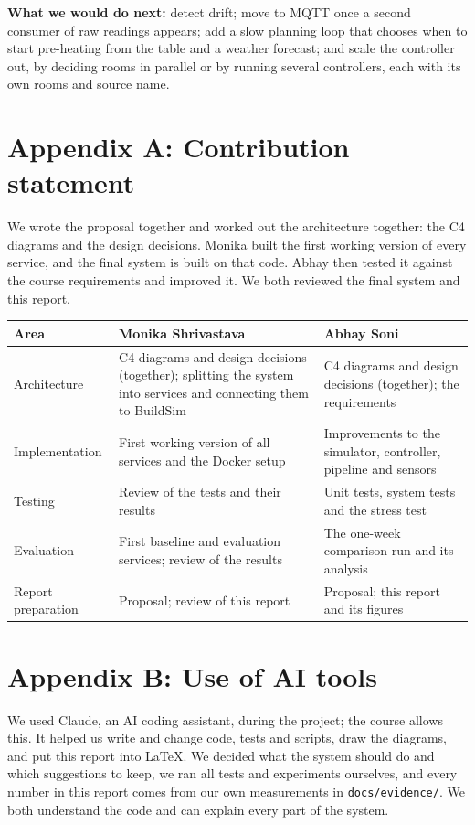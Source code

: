 \documentclass[11pt]{article}
\begin{document}
\textbf{What we would do next:} detect drift; move to MQTT once a second consumer of raw readings
appears; add a slow planning loop that chooses when to start pre-heating from the table and a
weather forecast; and scale the controller out, by deciding rooms in parallel or by running
several controllers, each with its own rooms and source name.

\section{Appendix A: Contribution statement}\label{appendix-a}

We wrote the proposal together and worked out the architecture together: the C4 diagrams and the
design decisions. Monika built the first working version of every service, and the final system is
built on that code. Abhay then tested it against the course requirements and improved it. We both
reviewed the final system and this report.

\begin{longtable}{@{}L{0.2}L{0.4}L{0.4}@{}}
\toprule
\textbf{Area} & \textbf{Monika Shrivastava} & \textbf{Abhay Soni} \\
\midrule
\endhead
\bottomrule
\endlastfoot
Architecture & C4 diagrams and design decisions (together); splitting the system into services and connecting them to BuildSim & C4 diagrams and design decisions (together); the requirements \\
Implementation & First working version of all services and the Docker setup & Improvements to the simulator, controller, pipeline and sensors \\
Testing & Review of the tests and their results & Unit tests, system tests and the stress test \\
Evaluation & First baseline and evaluation services; review of the results & The one-week comparison run and its analysis \\
Report preparation & Proposal; review of this report & Proposal; this report and its figures \\
\end{longtable}

\section{Appendix B: Use of AI tools}\label{appendix-b}

We used Claude, an AI coding assistant, during the project; the course allows this. It helped us
write and change code, tests and scripts, draw the diagrams, and put this report into LaTeX. We
decided what the system should do and which suggestions to keep, we ran all tests and experiments
ourselves, and every number in this report comes from our own measurements in
\texttt{docs/evidence/}. We both understand the code and can explain every part of the system.
\end{document}
